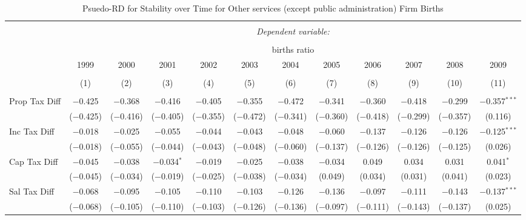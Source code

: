 
\begin{table}[!htbp] \centering 
  \caption{Psuedo-RD for Stability over Time for  Other services (except public administration) Firm Births} 
  \label{81year} 
\small 
\begin{tabular}{@{\extracolsep{5pt}}lccccccccccc} 
\\[-1.8ex]\hline 
\hline \\[-1.8ex] 
 & \multicolumn{11}{c}{\textit{Dependent variable:}} \\ 
\cline{2-12} 
\\[-1.8ex] & \multicolumn{11}{c}{births ratio} \\ 
 & 1999 & 2000 & 2001 & 2002 & 2003 & 2004 & 2005 & 2006 & 2007 & 2008 & 2009 \\ 
\\[-1.8ex] & (1) & (2) & (3) & (4) & (5) & (6) & (7) & (8) & (9) & (10) & (11)\\ 
\hline \\[-1.8ex] 
 Prop Tax Diff & $-$0.425 & $-$0.368 & $-$0.416 & $-$0.405 & $-$0.355 & $-$0.472 & $-$0.341 & $-$0.360 & $-$0.418 & $-$0.299 & $-$0.357$^{***}$ \\ 
  & ($-$0.425) & ($-$0.416) & ($-$0.405) & ($-$0.355) & ($-$0.472) & ($-$0.341) & ($-$0.360) & ($-$0.418) & ($-$0.299) & ($-$0.357) & (0.116) \\ 
  Inc Tax Diff & $-$0.018 & $-$0.025 & $-$0.055 & $-$0.044 & $-$0.043 & $-$0.048 & $-$0.060 & $-$0.137 & $-$0.126 & $-$0.126 & $-$0.125$^{***}$ \\ 
  & ($-$0.018) & ($-$0.055) & ($-$0.044) & ($-$0.043) & ($-$0.048) & ($-$0.060) & ($-$0.137) & ($-$0.126) & ($-$0.126) & ($-$0.125) & (0.026) \\ 
  Cap Tax Diff & $-$0.045 & $-$0.038 & $-$0.034$^{*}$ & $-$0.019 & $-$0.025 & $-$0.038 & $-$0.034 & 0.049 & 0.034 & 0.031 & 0.041$^{*}$ \\ 
  & ($-$0.045) & ($-$0.034) & ($-$0.019) & ($-$0.025) & ($-$0.038) & ($-$0.034) & (0.049) & (0.034) & (0.031) & (0.041) & (0.023) \\ 
  Sal Tax Diff & $-$0.068 & $-$0.095 & $-$0.105 & $-$0.110 & $-$0.103 & $-$0.126 & $-$0.136 & $-$0.097 & $-$0.111 & $-$0.143 & $-$0.137$^{***}$ \\ 
  & ($-$0.068) & ($-$0.105) & ($-$0.110) & ($-$0.103) & ($-$0.126) & ($-$0.136) & ($-$0.097) & ($-$0.111) & ($-$0.143) & ($-$0.137) & (0.025) \\ 

\end{tabular}
\end{table}
